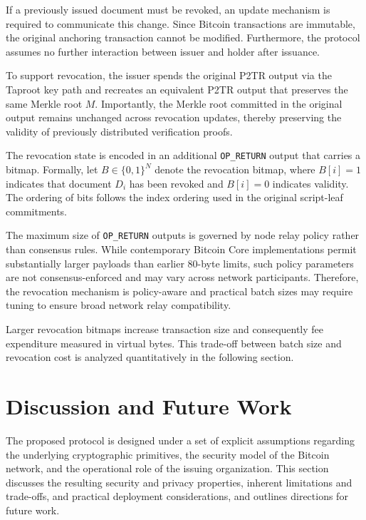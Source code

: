 \documentclass{ieeeaccess}
\begin{document}
If a previously issued document must be revoked, an update mechanism is required to communicate this change.
Since Bitcoin transactions are immutable, the original anchoring transaction cannot be modified.
Furthermore, the protocol assumes no further interaction between issuer and holder after issuance.

To support revocation, the issuer spends the original P2TR output via the Taproot key path and recreates an equivalent P2TR output that preserves the same Merkle root $M$.
Importantly, the Merkle root committed in the original output remains unchanged across revocation updates, thereby preserving the validity of previously distributed verification proofs.

The revocation state is encoded in an additional \texttt{OP\_RETURN} output that carries a bitmap.
Formally, let $B \in \{0,1\}^N$ denote the revocation bitmap, where $B[i]=1$ indicates that document $D_i$ has been revoked and $B[i]=0$ indicates validity.
The ordering of bits follows the index ordering used in the original script-leaf commitments.

The maximum size of \texttt{OP\_RETURN} outputs is governed by node relay policy rather than consensus rules.
While contemporary Bitcoin Core implementations permit substantially larger payloads than earlier 80-byte limits, such policy parameters are not consensus-enforced and may vary across network participants.
Therefore, the revocation mechanism is policy-aware and practical batch sizes may require tuning to ensure broad network relay compatibility.

Larger revocation bitmaps increase transaction size and consequently fee expenditure measured in virtual bytes.
This trade-off between batch size and revocation cost is analyzed quantitatively in the following section.







\section{Discussion and Future Work}
\label{sec.discussion}

The proposed protocol is designed under a set of explicit assumptions regarding the underlying cryptographic primitives, the security model of the Bitcoin network, and the operational role of the issuing organization.
This section discusses the resulting security and privacy properties, inherent limitations and trade-offs, and practical deployment considerations, and outlines directions for future work.
\end{document}
